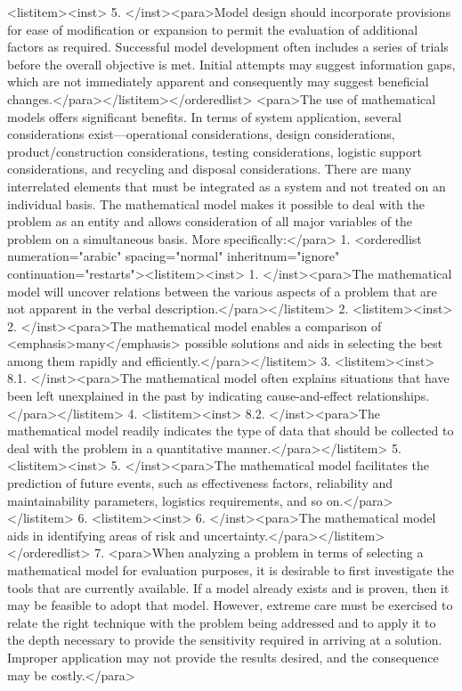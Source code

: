 <listitem><inst>	5.	</inst><para>Model design should incorporate provisions for ease of modification or expansion to permit the evaluation of additional factors as required. Successful model development often includes a series of trials before the overall objective is met. Initial attempts may suggest information gaps, which are not immediately apparent and consequently may suggest beneficial changes.</para></listitem></orderedlist>
<para>The use of mathematical models offers significant benefits. In terms of system application, several considerations exist—operational considerations, design considerations, product/construction considerations, testing considerations, logistic support considerations, and recycling and disposal considerations. There are many interrelated elements that must be integrated as a system and not treated on an individual basis. The mathematical model makes it possible to deal with the problem as an entity and allows consideration of all major variables of the problem on a simultaneous basis. More specifically:</para>
    1. <orderedlist numeration="arabic" spacing="normal" inheritnum="ignore" continuation="restarts"><listitem><inst>	1.	</inst><para>The mathematical model will uncover relations between the various aspects of a problem that are not apparent in the verbal description.</para></listitem>
    2. <listitem><inst>	2.	</inst><para>The mathematical model enables a comparison of <emphasis>many</emphasis> possible solutions and aids in selecting the best among them rapidly and efficiently.</para></listitem>
    3. <listitem><inst>	8.1.	</inst><para>The mathematical model often explains situations that have been left unexplained in the past by indicating cause-and-effect relationships.</para></listitem>
    4. <listitem><inst>	8.2.	</inst><para>The mathematical model readily indicates the type of data that should be collected to deal with the problem in a quantitative manner.</para></listitem>
    5. <listitem><inst>	5.	</inst><para>The mathematical model facilitates the prediction of future events, such as effectiveness factors, reliability and maintainability parameters, logistics requirements, and so on.</para></listitem>
    6. <listitem><inst>	6.	</inst><para>The mathematical model aids in identifying areas of risk and uncertainty.</para></listitem></orderedlist>
    7. <para>When analyzing a problem in terms of selecting a mathematical model for evaluation purposes, it is desirable to first investigate the tools that are currently available. If a model already exists and is proven, then it may be feasible to adopt that model. However, extreme care must be exercised to relate the right technique with the problem being addressed and to apply it to the depth necessary to provide the sensitivity required in arriving at a solution. Improper application may not provide the results desired, and the consequence may be costly.</para>
